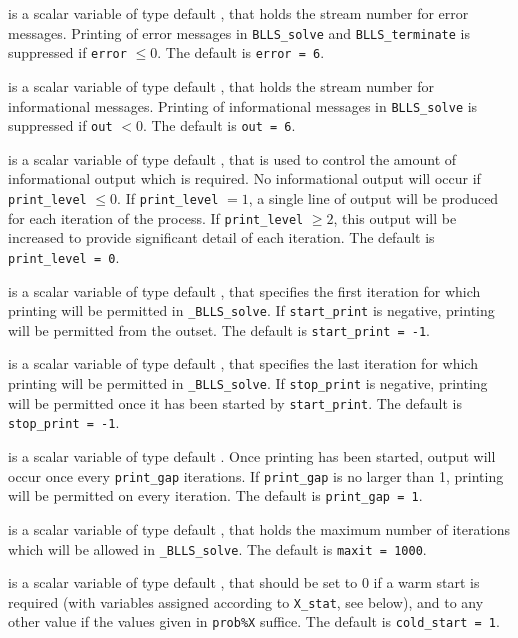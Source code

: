 \documentclass{galahad}
\newcommand{\packagename}{BLLS}
\newcommand{\fullpackagename}{\libraryname\_\packagename}
\newcommand{\solver}{{\tt \fullpackagename\_solve}}
\begin{document}
\begin{description}

 is a scalar variable of type default \integer, that holds the
stream number for error messages. Printing of error messages in
{\tt \packagename\_solve} and {\tt \packagename\_terminate}
is suppressed if {\tt error} $\leq 0$.
The default is {\tt error = 6}.

 is a scalar variable of type default \integer, that holds the
stream number for informational messages. Printing of informational messages in
{\tt \packagename\_solve} is suppressed if {\tt out} $< 0$.
The default is {\tt out = 6}.

 is a scalar variable of type default \integer, that is used
to control the amount of informational output which is required. No
informational output will occur if {\tt print\_level} $\leq 0$. If
{\tt print\_level} $= 1$, a single line of output will be produced for each
iteration of the process. If {\tt print\_level} $\geq 2$, this output will be
increased to provide significant detail of each iteration.
The default is {\tt print\_level = 0}.

 is a scalar variable of type default \integer, that specifies
the first iteration for which printing will be permitted in \solver.
If {\tt start\_print} is negative, printing will be permitted from the outset.
The default is {\tt start\_print = -1}.

 is a scalar variable of type default \integer, that specifies
the last iteration for which printing will be permitted in  \solver.
If {\tt stop\_print} is negative, printing will be permitted once it has been
started by {\tt start\_print}.
The default is {\tt stop\_print = -1}.

 is a scalar variable of type default \integer.
Once printing has been started, output will occur once every
{\tt print\_gap} iterations. If {\tt print\_gap} is no larger than 1,
printing will be permitted on every iteration.
The default is {\tt print\_gap = 1}.

 is a scalar variable of type default \integer, that holds the
maximum number of iterations which will be allowed in \solver.
The default is {\tt maxit = 1000}.

 is a scalar variable of type default \integer, that
should be set to 0 if a warm start is required (with variables
assigned according to {\tt X\_stat}, see below), and to any other value if the
values given in {\tt prob\%X} suffice.
The default is {\tt cold\_start = 1}.


\end{description}
\end{document}
